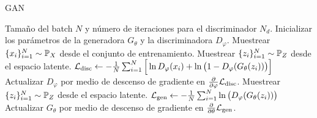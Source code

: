 {{\begin{algorithm}[tbhp]
    \caption{GAN}\label{alg:GAN}
    \begin{algorithmic}
        \Require Tamaño del batch $N$ y número de iteraciones para el discriminador $N_d$.
        \State Inicializar los parámetros de la generadora $G_\theta$ y la discriminadora $D_\varphi$.
        \State Muestrear $\{x_i\}_{i=1}^{N} \sim \Prob_X$ desde el conjunto de entrenamiento.
        \State Muestrear $\{z_i\}_{i=1}^{N} \sim \Prob_Z$ desde el espacio latente.
        \State $\cL_{\mathrm{disc}} \gets -\frac{1}{N}\sum_{i=1}^{N} \Big[ \ln D_\varphi(x_i) + \ln \qty\big(1 - D_\varphi(G_\theta(z_i))) \Big]$
        \State Actualizar $D_\varphi$ por medio de descenso de gradiente en $\pdv{\varphi} \cL_{\mathrm{disc}}$.
        \EndFor
        \State Muestrear $\{z_i\}_{i=1}^{N} \sim \Prob_Z$ desde el espacio latente.
        \State $\cL_{\mathrm{gen}} \gets - \frac{1}{N}\sum_{i=1}^{N} \ln \qty\big(D_\varphi(G_\theta(z_i)))$
        \State Actualizar $G_\theta$ por medio de descenso de gradiente en $\pdv{\theta} \mathcal{L}_{\mathrm{gen}}$.
        \EndWhile
    \end{algorithmic}
\end{algorithm}

}}
